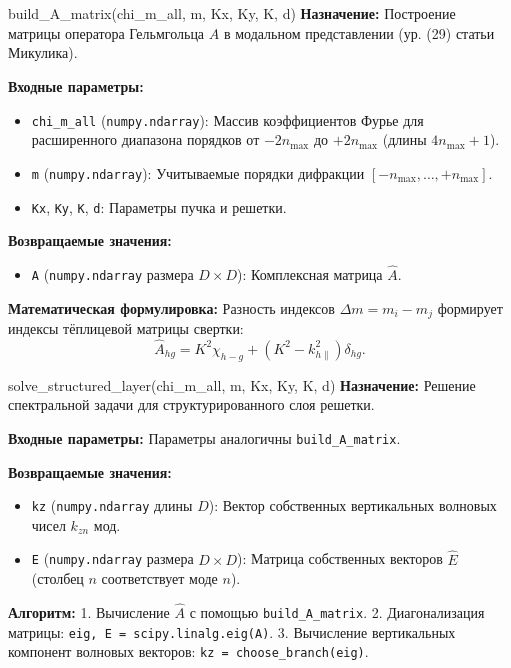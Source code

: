 \documentclass[a4paper,11pt]{article}
\begin{document}
\begin{funcbox}{build\_A\_matrix(chi\_m\_all, m, Kx, Ky, K, d)}
\textbf{Назначение:} Построение матрицы оператора Гельмгольца $\hat{A}$ в модальном представлении (ур. (29) статьи Микулика).

\textbf{Входные параметры:}
\begin{itemize}
    \item \texttt{chi\_m\_all} (\texttt{numpy.ndarray}): Массив коэффициентов Фурье для расширенного диапазона порядков от $-2n_{\max}$ до $+2n_{\max}$ (длины $4n_{\max} + 1$).
    \item \texttt{m} (\texttt{numpy.ndarray}): Учитываемые порядки дифракции $[-n_{\max}, \dots, +n_{\max}]$.
    \item \texttt{Kx}, \texttt{Ky}, \texttt{K}, \texttt{d}: Параметры пучка и решетки.
\end{itemize}

\textbf{Возвращаемые значения:}
\begin{itemize}
    \item \texttt{A} (\texttt{numpy.ndarray} размера $D \times D$): Комплексная матрица $\hat{A}$.
\end{itemize}

\textbf{Математическая формулировка:}
Разность индексов $\Delta m = m_i - m_j$ формирует индексы тёплицевой матрицы свертки:
\begin{equation*}
\hat{A}_{hg} = K^2 \chi_{h-g} + \left( K^2 - k_{h\parallel}^2 \right) \delta_{hg}.
\end{equation*}
\end{funcbox}

\begin{funcbox}{solve\_structured\_layer(chi\_m\_all, m, Kx, Ky, K, d)}
\textbf{Назначение:} Решение спектральной задачи для структурированного слоя решетки.

\textbf{Входные параметры:} Параметры аналогичны \texttt{build\_A\_matrix}.

\textbf{Возвращаемые значения:}
\begin{itemize}
    \item \texttt{kz} (\texttt{numpy.ndarray} длины $D$): Вектор собственных вертикальных волновых чисел $k_{zn}$ мод.
    \item \texttt{E} (\texttt{numpy.ndarray} размера $D \times D$): Матрица собственных векторов $\hat{E}$ (столбец $n$ соответствует моде $n$).
\end{itemize}

\textbf{Алгоритм:}
1. Вычисление $\hat{A}$ с помощью \texttt{build\_A\_matrix}.
2. Диагонализация матрицы: \texttt{eig, E = scipy.linalg.eig(A)}.
3. Вычисление вертикальных компонент волновых векторов: \texttt{kz = choose\_branch(eig)}.
\end{funcbox}
\end{document}
